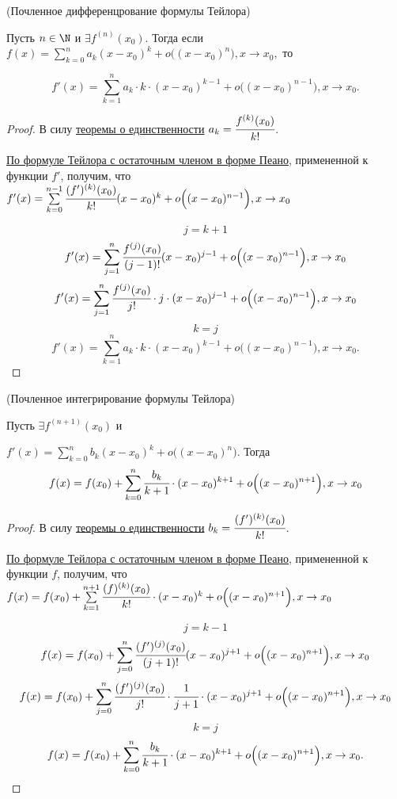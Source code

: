 \begin{theorem}
	\hypertarget{thrm7.3}{(Почленное дифференцрование формулы Тейлора)} Пусть $n\in \N$ и $\exists f^{(n)}(x_{0}).$ Тогда если $f(x) = \sum\limits_{k =0}^{n} a_{k}(x-x_{0})^{k} + o\Big((x-x_{0})^{n}\Big), x \to x_{0},$ то 
	
	$$f'(x) = \sum\limits_{k = 1}^{n} a_{k} \cdot k \cdot (x-x_{0})^{k-1} + o\Big((x-x_{0})^{n-1}\Big), x \to x_{0}.$$
\end{theorem}
\begin{proof}
	В силу \hyperlink{thrm7.2}{теоремы о единственности} $a_{k} = \cfrac{f^{(k)}(x_{0})}{k!}$.
	
	\hyperlink{thrm7.1}{По формуле Тейлора с остаточным членом в форме Пеано}, примененной к функции $f'$, получим, что $f'(x) = \sum\limits_{k = 0}^{n-1} \cfrac{(f')^{(k)}(x_{0})}{k!} (x-x_{0})^{k} + o\Big((x-x_{0})^{n-1}\Big), x \to x_{0}$
	
	$$
	j = k+1
	$$
	$$
	f'(x) = \sum\limits_{j = 1}^{n} \cfrac{f^{(j)}(x_{0})}{(j-1)!} (x-x_{0})^{j-1} + o\Big((x-x_{0})^{n-1}\Big), x \to x_{0}
	$$
	$$
	f'(x) = \sum\limits_{j = 1}^{n} \cfrac{f^{(j)}(x_{0})}{j!} \cdot j \cdot (x-x_{0})^{j-1} + o\Big((x-x_{0})^{n-1}\Big), x \to x_{0}
	$$
	$$
	k = j
	$$
	$$f'(x) = \sum\limits_{k = 1}^{n} a_{k} \cdot k \cdot (x-x_{0})^{k-1} + o\Big((x-x_{0})^{n-1}\Big), x \to x_{0}.$$
\end{proof}

\begin{theorem}
	\hypertarget{thrm7.4}{(Почленное интегрирование формулы Тейлора)} Пусть $\exists f^{(n+1)}(x_{0})$ и 
	
	$f'(x) = \sum\limits_{k = 0}^{n} b_{k}(x-x_{0})^{k} + o \Big((x-x_{0})^{n}\Big)$. Тогда 
	$$f(x) = f(x_{0}) + \sum\limits_{k=0}^{n} \cfrac{b_{k}}{k+1} \cdot (x-x_{0})^{k+1} + o\Big((x-x_{0})^{n+1}\Big), x\to x_{0}$$
\end{theorem}
\begin{proof}
	В силу \hyperlink{thrm7.2}{теоремы о единственности} $b_{k} = \cfrac{(f')^{(k)}(x_{0})}{k!}$.
	
	\hyperlink{thrm7.1}{По формуле Тейлора с остаточным членом в форме Пеано}, примененной к функции $f$, получим, что $f(x) = f(x_{0})+\sum\limits_{k = 1}^{n+1} \cfrac{(f)^{(k)}(x_{0})}{k!} \cdot (x-x_{0})^{k} + o\Big((x-x_{0})^{n+1}\Big), x \to x_{0}$
	
	$$
	j = k-1
	$$
	$$
	f(x) =f(x_{0}) +  \sum\limits_{j = 0}^{n} \cfrac{(f')^{(j)}(x_{0})}{(j+1)!} (x-x_{0})^{j+1} + o\Big((x-x_{0})^{n+1}\Big), x \to x_{0}
	$$
	$$
	f(x) = f(x_{0}) + \sum\limits_{j = 0}^{n} \cfrac{(f')^{(j)}(x_{0})}{j!} \cdot \cfrac{1}{j+1} \cdot (x-x_{0})^{j+1} + o\Big((x-x_{0})^{n+1}\Big), x \to x_{0}
	$$
	$$
	k = j
	$$
	$$f(x) = f(x_{0}) +  \sum\limits_{k = 0}^{n} \cfrac{b_{k}}{k + 1} \cdot (x-x_{0})^{k+1} + o\Big((x-x_{0})^{n+1}\Big), x \to x_{0}.$$
\end{proof}

